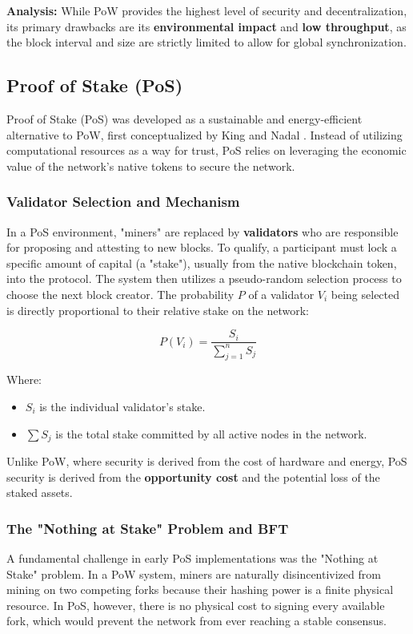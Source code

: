 \textbf{Analysis:} While PoW provides the highest level of security and decentralization, its primary drawbacks are its \textbf{environmental impact} and \textbf{low throughput}, as the block interval and size are strictly limited to allow for global synchronization.
\subsection{Proof of Stake (PoS)}
Proof of Stake (PoS) was developed as a sustainable and energy-efficient alternative to PoW, first conceptualized by King and Nadal \cite{king2012ppcoin}. Instead of utilizing computational resources as a way for trust, PoS relies on leveraging the economic value of the network's native tokens to secure the network.

\subsubsection{Validator Selection and Mechanism}
In a PoS environment, "miners" are replaced by \textbf{validators} who are responsible for proposing and attesting to new blocks. To qualify, a participant must lock a specific amount of capital (a "stake"), usually from the native blockchain token, into the protocol. The system then utilizes a pseudo-random selection process to choose the next block creator. The probability $P$ of a validator $V_i$ being selected is directly proportional to their relative stake on the network:

\begin{equation}
    P(V_i) = \frac{S_i}{\sum_{j=1}^{n} S_j}
\end{equation}

Where:
\begin{itemize}
    \item $S_i$ is the individual validator's stake.
    \item $\sum S_j$ is the total stake committed by all active nodes in the network.
\end{itemize}



Unlike PoW, where security is derived from the cost of hardware and energy, PoS security is derived from the \textbf{opportunity cost} and the potential loss of the staked assets.

\subsubsection{The "Nothing at Stake" Problem and BFT}
A fundamental challenge in early PoS implementations was the "Nothing at Stake" problem. In a PoW system, miners are naturally disincentivized from mining on two competing forks because their hashing power is a finite physical resource. In PoS, however, there is no physical cost to signing every available fork, which would prevent the network from ever reaching a stable consensus.

